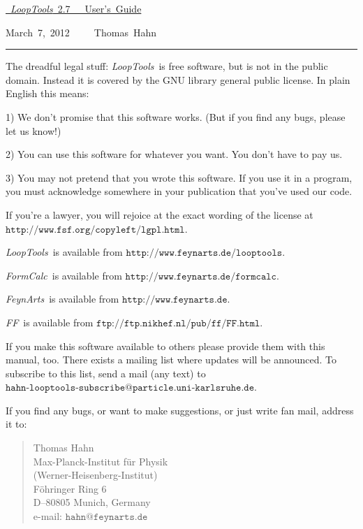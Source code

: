 \documentclass[twoside,12pt]{report}
\def\FA{\textit{FeynArts}}
\def\FC{\textit{FormCalc}}
\def\FF{\textit{FF}}
\def\LT{\textit{LoopTools}}
\def\Code#1{\ensuremath{\texttt{#1}}}
\begin{document}
\thispagestyle{empty}

\vspace*{.7\textheight}

\hfill\hbox{\underline{%
\vrule width 0pt height 0pt depth 2ex%
\Huge \LT~2.7~~~User's Guide}}

\vspace*{1ex}

\hfill\hbox{March 7, 2012~~~~~Thomas Hahn}

\clearpage

\vspace*{.5\textheight}
\vfill

\hrule

\medskip

\begin{scriptsize}
The dreadful legal stuff:
\LT\ is free software, but is not in the public domain.
Instead it is covered by the GNU library general public license.
In plain English this means:

1) We don't promise that this software works.   
(But if you find any bugs, please let us know!)

2) You can use this software for whatever you want.
You don't have to pay us.

3) You may not pretend that you wrote this software.
If you use it in a program, you must acknowledge
somewhere in your publication that you've used  
our code.

If you're a lawyer, you will rejoice at the exact wording of the license 
at \Code{http://www.fsf.org/copyleft/lgpl.html}.

\LT\ is available from \Code{http://www.feynarts.de/looptools}.

\FC\ is available from \Code{http://www.feynarts.de/formcalc}.

\FA\ is available from \Code{http://www.feynarts.de}.

\FF\ is available from \Code{ftp://ftp.nikhef.nl/pub/ff/FF.html}.

If you make this software available to others please provide them with
this manual, too. There exists a mailing list where updates will be
announced. To subscribe to this list, send a mail (any text) to
\Code{hahn-looptools-subscribe@particle.uni-karlsruhe.de}.

If you find any bugs, or want to make suggestions, or just write fan mail,
address it to:
\vspace*{-2ex}
\begin{quote}
Thomas Hahn \\
Max-Planck-Institut f\"ur Physik \\
(Werner-Heisenberg-Institut) \\
F\"ohringer Ring 6 \\
D--80805 Munich, Germany \\
e-mail: \Code{hahn@feynarts.de}
\end{quote}
\end{scriptsize}
\end{document}
